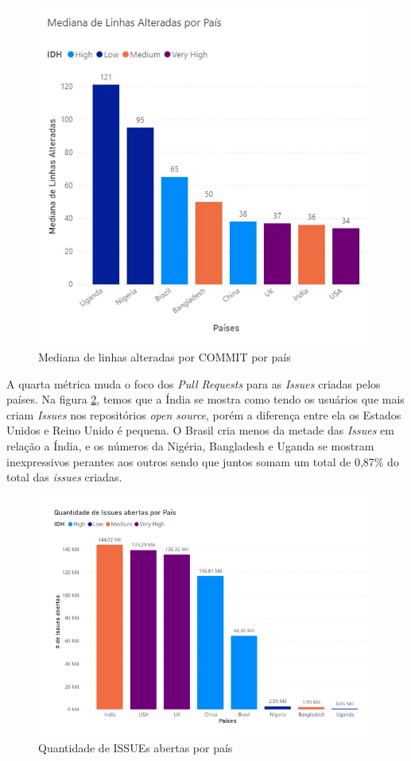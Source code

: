 \documentclass[12pt]{article}
\begin{document}
\begin{figure}[H]
\centering
\includegraphics[width=1\textwidth]{img/rq3/mediana linhas.png}
\caption{Mediana de linhas alteradas por COMMIT por país}
\label{fig:medianalinhas}
\end{figure}

A quarta métrica muda o foco dos \textit{Pull Requests} para as \textit{Issues} criadas pelos países. Na figura \ref{fig:qttissues}, temos que a Índia se mostra como tendo os usuários que mais criam \textit{Issues} nos repositórios \textit{open source}, porém a diferença entre ela os Estados Unidos e Reino Unido é pequena. O Brasil cria menos da metade das \textit{Issues} em relação a Índia, e os números da Nigéria, Bangladesh e Uganda se mostram inexpressivos perantes aos outros sendo que juntos somam um total de 0,87\% do total das \textit{issues} criadas.

\begin{figure}[H]
\centering
\includegraphics[width=1\textwidth]{img/rq3/number of issues.png}
\caption{Quantidade de ISSUEs abertas por país}
\label{fig:qttissues}
\end{figure}
\end{document}
